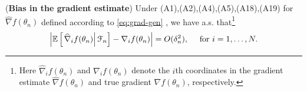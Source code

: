 \begin{lemma}(\textbf{Bias in the gradient estimate})
\label{lemma:1rdsa-bias}
Under (A1),(A2),(A4),(A5),(A18),(A19) for $\widehat\nabla f(\theta_n)$ defined according to  \eqref{eq:grad-gen} , we have a.s. that\footnote{Here $\widehat\nabla_i f(\theta_n)$ and $\nabla_i f(\theta_n)$ denote the $i$th coordinates in the gradient estimate $\widehat\nabla f(\theta_n)$ and true gradient $\nabla f(\theta_n)$, respectively.}
\begin{align}
 \left| \mathbb{E}\left[\left.\widehat\nabla_i f(\theta_n)\right| \mathcal{F}_n \right] - \nabla_i f(\theta_n)\right| = O(\delta_n^2),  \quad \text{ for } i=1,\ldots,N.
\end{align} 
\end{lemma}

